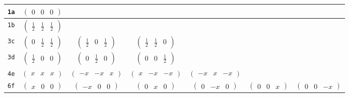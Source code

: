\documentclass[fleqn,9pt,landscape]{jsarticle}
\begin{document}
\begin{center}
\begin{longtable}{ccccccc}
{\tt 1a} & $ \begin{pmatrix} 0 & 0 & 0 \end{pmatrix} $ & $  $ & $  $ & $  $ & $  $ & $  $ \\ \hline
{\tt 1b} & $ \begin{pmatrix} \frac{1}{2} & \frac{1}{2} & \frac{1}{2} \end{pmatrix} $ & $  $ & $  $ & $  $ & $  $ & $  $ \\ \hline
{\tt 3c} & $ \begin{pmatrix} 0 & \frac{1}{2} & \frac{1}{2} \end{pmatrix} $ & $ \begin{pmatrix} \frac{1}{2} & 0 & \frac{1}{2} \end{pmatrix} $ & $ \begin{pmatrix} \frac{1}{2} & \frac{1}{2} & 0 \end{pmatrix} $ & $  $ & $  $ & $  $ \\ \hline
{\tt 3d} & $ \begin{pmatrix} \frac{1}{2} & 0 & 0 \end{pmatrix} $ & $ \begin{pmatrix} 0 & \frac{1}{2} & 0 \end{pmatrix} $ & $ \begin{pmatrix} 0 & 0 & \frac{1}{2} \end{pmatrix} $ & $  $ & $  $ & $  $ \\ \hline
{\tt 4e} & $ \begin{pmatrix} x & x & x \end{pmatrix} $ & $ \begin{pmatrix} - x & - x & x \end{pmatrix} $ & $ \begin{pmatrix} x & - x & - x \end{pmatrix} $ & $ \begin{pmatrix} - x & x & - x \end{pmatrix} $ & $  $ & $  $ \\ \hline
{\tt 6f} & $ \begin{pmatrix} x & 0 & 0 \end{pmatrix} $ & $ \begin{pmatrix} - x & 0 & 0 \end{pmatrix} $ & $ \begin{pmatrix} 0 & x & 0 \end{pmatrix} $ & $ \begin{pmatrix} 0 & - x & 0 \end{pmatrix} $ & $ \begin{pmatrix} 0 & 0 & x \end{pmatrix} $ & $ \begin{pmatrix} 0 & 0 & - x \end{pmatrix} $ \\ \hline

\end{longtable}
\end{center}
\end{document}

